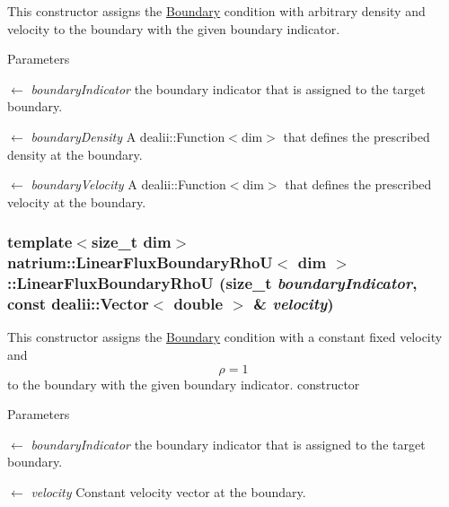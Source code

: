 This constructor assigns the \hyperlink{classnatrium_1_1Boundary}{Boundary} condition with arbitrary density and velocity to the boundary with the given boundary indicator. 
\begin{DoxyParams}{Parameters}
\item[\mbox{$\leftarrow$} {\em boundaryIndicator}]the boundary indicator that is assigned to the target boundary. \item[\mbox{$\leftarrow$} {\em boundaryDensity}]A dealii::Function$<$dim$>$ that defines the prescribed density at the boundary. \item[\mbox{$\leftarrow$} {\em boundaryVelocity}]A dealii::Function$<$dim$>$ that defines the prescribed velocity at the boundary. \end{DoxyParams}
\hypertarget{classnatrium_1_1LinearFluxBoundaryRhoU_a6e1fb2da612fc3bfa77dfd61e5f7585e}{
\subsubsection[{LinearFluxBoundaryRhoU}]{\setlength{\rightskip}{0pt plus 5cm}template$<$size\_\-t dim$>$ {\bf natrium::LinearFluxBoundaryRhoU}$<$ dim $>$::{\bf LinearFluxBoundaryRhoU} (size\_\-t {\em boundaryIndicator}, \/  const dealii::Vector$<$ double $>$ \& {\em velocity})}}
\label{classnatrium_1_1LinearFluxBoundaryRhoU_a6e1fb2da612fc3bfa77dfd61e5f7585e}


This constructor assigns the \hyperlink{classnatrium_1_1Boundary}{Boundary} condition with a constant fixed velocity and \[ \rho = 1 \] to the boundary with the given boundary indicator. constructor


\begin{DoxyParams}{Parameters}
\item[\mbox{$\leftarrow$} {\em boundaryIndicator}]the boundary indicator that is assigned to the target boundary. \item[\mbox{$\leftarrow$} {\em velocity}]Constant velocity vector at the boundary. \end{DoxyParams}


